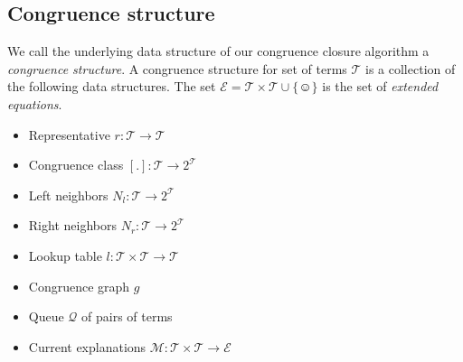 \subsection*{Congruence structure}

We call the underlying data structure of our congruence closure algorithm a \emph{congruence structure}.
A congruence structure for set of terms $\mathcal{T}$ is a collection of the following data structures.
The set $\mathcal{E} = \mathcal{T} \times \mathcal{T} \cup \{\smiley\}$ is the set of \emph{extended equations}.

\begin{itemize}
	\item Representative $r: \mathcal{T} \rightarrow \mathcal{T}$
	\item Congruence class $[.]: \mathcal{T} \rightarrow 2^\mathcal{T}$
	\item Left neighbors $N_l: \mathcal{T} \rightarrow 2^\mathcal{T}$
	\item Right neighbors $N_r: \mathcal{T} \rightarrow 2^\mathcal{T}$
	\item Lookup table $l: \mathcal{T} \times \mathcal{T} \rightarrow \mathcal{T}$
	\item Congruence graph $g$
	\item Queue $\mathcal{Q}$ of pairs of terms
	\item Current explanations $\mathcal{M}: \mathcal{T} \times \mathcal{T} \rightarrow \mathcal{E}$
\end{itemize}

